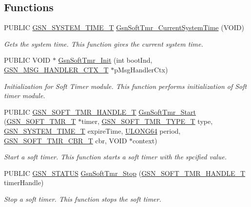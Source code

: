 \subsection*{Functions}
\begin{DoxyCompactItemize}
\item 
PUBLIC \hyperlink{a00673_gad1e755eb904493a09bf8df25a4519bf0}{GSN\_\-SYSTEM\_\-TIME\_\-T} \hyperlink{a00673_gab43287ce366da3d600e6c49ccb30a0ef}{GsnSoftTmr\_\-CurrentSystemTime} (VOID)
\begin{DoxyCompactList}\small\item\em Gets the system time. This function gives the current system time. \end{DoxyCompactList}\item 
PUBLIC VOID $\ast$ \hyperlink{a00673_gab432d57164d1bfe35b788fc811549755}{GsnSoftTmr\_\-Init} (int bootInd, \hyperlink{a00155}{GSN\_\-MSG\_\-HANDLER\_\-CTX\_\-T} $\ast$pMsgHandlerCtx)
\begin{DoxyCompactList}\small\item\em Initialization for Soft Timer module. This function performs initialization of Soft timer module. \end{DoxyCompactList}\item 
PUBLIC \hyperlink{a00229}{GSN\_\-SOFT\_\-TMR\_\-HANDLE\_\-T} \hyperlink{a00673_ga942fccace7c0d212530861bdb68ca1dd}{GsnSoftTmr\_\-Start} (\hyperlink{a00229}{GSN\_\-SOFT\_\-TMR\_\-T} $\ast$timer, \hyperlink{a00673_ga599ea0a212c1bcd484a64610d070b5af}{GSN\_\-SOFT\_\-TMR\_\-TYPE\_\-T} type, \hyperlink{a00673_gad1e755eb904493a09bf8df25a4519bf0}{GSN\_\-SYSTEM\_\-TIME\_\-T} expireTime, \hyperlink{a00660_ga28961430434ccabca6862ea93fe9a15b}{ULONG64} period, \hyperlink{a00673_ga9bb74ab1272c117587bf1fadf84849de}{GSN\_\-SOFT\_\-TMR\_\-CBR\_\-T} cbr, VOID $\ast$context)
\begin{DoxyCompactList}\small\item\em Start a soft timer. This function starts a soft timer with the spcified value. \end{DoxyCompactList}\item 
PUBLIC \hyperlink{a00660_gada5951904ac6110b1fa95e51a9ddc217}{GSN\_\-STATUS} \hyperlink{a00673_gad048a3743bc158c60bc6382309d04398}{GsnSoftTmr\_\-Stop} (\hyperlink{a00229}{GSN\_\-SOFT\_\-TMR\_\-HANDLE\_\-T} timerHandle)
\begin{DoxyCompactList}\small\item\em Stop a soft timer. This function stops the soft timer. \end{DoxyCompactList}\item 

\end{DoxyCompactItemize}
